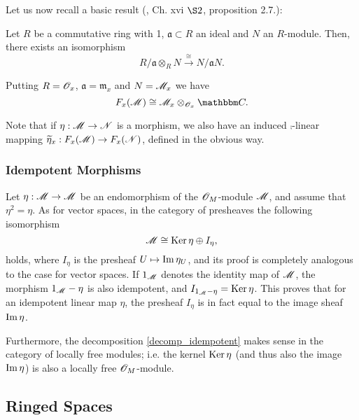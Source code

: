 Let us now recall a basic result (\cite{lang:_algebra}, Ch. {\sc xvi} $\S2$, proposition 2.7.):

\begin{proposition}\label{fibre}
Let $R$ be a commutative ring with 1, $\mathfrak{a}\subset R$ an ideal and $N$ an $R$-module. Then, there exists an isomorphism
\begin{equation}\label{fiber_iso}
R/\mathfrak{a}\otimes_R N\stackrel{\cong}{\longrightarrow}N/\mathfrak{a}N.
\end{equation}
\end{proposition}

Putting $R=\mathscr{O}_x$, $\mathfrak{a}=\mathfrak{m}_x$ and $N=\mathscr{M}_x$ we have
$$F_x(\scr{M}) \cong \scr{M}_x\otimes_{\scr{O}_x}\comp .$$

Note that if $\eta :\mathscr{M}\to \mathscr{N}$ is a morphism, we also have an induced $\comp$-linear mapping $\widetilde{\eta}_x:F_x(\mathscr{M})\to  F_x(\mathscr{N})$, defined in the obvious way.



\subsubsection{Idempotent Morphisms}

Let $\eta:\mathscr{M}\to \mathscr{M}$ be an endomorphism of the $\mathscr{O}_M$-module $\mathscr{M}$, and assume that $\eta^2=\eta$. As for vector spaces, in the category of presheaves the following isomorphism
\begin{equation}\label{decomp_idempotent}
\mathscr{M}\cong \operatorname{Ker}\eta \oplus I_{\eta},
\end{equation}
holds, where $I_{\eta}$ is the presheaf $U\mapsto \operatorname{Im}\eta_U$, and its proof is completely analogous to the case for vector spaces. If $1_{\mathscr{M}}$ denotes the identity map of $\mathscr{M}$, the morphism $1_{\mathscr{M}}-\eta$ is also idempotent, and $I_{1_{\mathscr{M}}-\eta}=\operatorname{Ker}\eta$. This proves that for an idempotent linear map $\eta$, the presheaf $I_{\eta}$ is in fact equal to the image sheaf $\operatorname{Im}\eta$.

Furthermore, the decomposition \eqref{decomp_idempotent} makes sense in the category of locally free modules; i.e. the kernel $\operatorname{Ker}\eta$ (and thus also the image $\operatorname{Im}\eta$) is also a locally free $\mathscr{O}_M$-module.





\subsection{Ringed Spaces}

